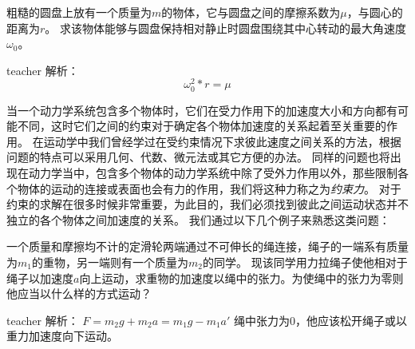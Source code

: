 \begin{example}
	粗糙的圆盘上放有一个质量为$m$的物体，它与圆盘之间的摩擦系数为$\mu$，与圆心的距离为$r$。
	求该物体能够与圆盘保持相对静止时圆盘围绕其中心转动的最大角速度$\omega_0$。
	\begin{taggedblock}{teacher}
		\newline
		解析：
		\[\omega_0^2*r=\mu\]
	\end{taggedblock}
\end{example}




当一个动力学系统包含多个物体时，它们在受力作用下的加速度大小和方向都有可能不同，这时它们之间的约束对于确定各个物体加速度的关系起着至关重要的作用。
在运动学中我们曾经学过在受约束情况下求彼此速度之间关系的方法，根据问题的特点可以采用几何、代数、微元法或其它方便的办法。
同样的问题也将出现在动力学当中，包含多个物体的动力学系统中除了受外力作用以外，那些限制各个物体的运动的连接或表面也会有力的作用，我们将这种力称之为\emph{约束力}。
对于约束的求解在很多时候非常重要，为此目的，我们必须找到彼此之间运动状态并不独立的各个物体之间加速度的关系。
我们通过以下几个例子来熟悉这类问题：


\begin{example}
	一个质量和摩擦均不计的定滑轮两端通过不可伸长的绳连接，绳子的一端系有质量为$m_1$的重物，另一端则有一个质量为$m_2$的同学。
	现该同学用力拉绳子使他相对于绳子以加速度$a$向上运动，求重物的加速度以绳中的张力。为使绳中的张力为零则他应当以什么样的方式运动？
	\begin{taggedblock}{teacher}
		\newline
		解析：
		$F=m_2g+m_2a=m_1g-m_1a'$
		绳中张力为0，他应该松开绳子或以重力加速度向下运动。
	\end{taggedblock}
\end{example}


